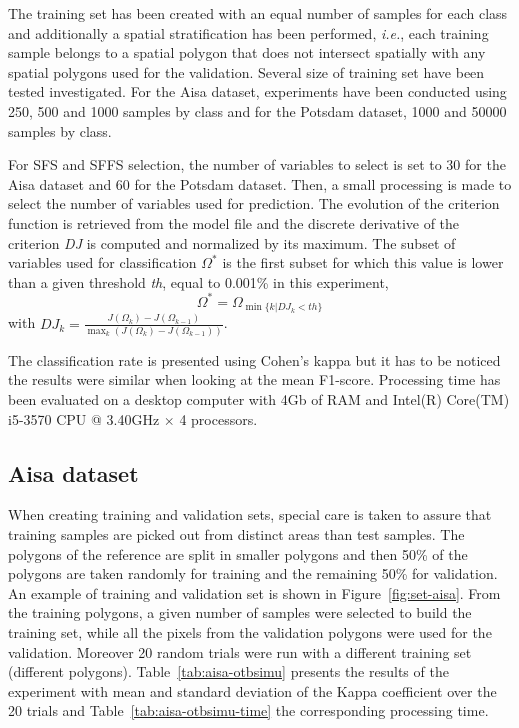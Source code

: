 \documentclass[journal,peerreview,onecolumn]{IEEEtran}
\begin{document}
    The training set has been created  with an equal number of samples
    for each class and additionally  a spatial stratification has been
    performed, \emph{i.e.}, each training  sample belongs to a spatial
    polygon  that  does  not  intersect  spatially  with  any  spatial
    polygons used  for the validation.   Several size of  training set
    have been tested investigated.   For the Aisa dataset, experiments
    have been conducted  using 250, 500 and 1000 samples  by class and
    for the Potsdam dataset, 1000 and 50000 samples by class.

    For SFS and  SFFS selection, the number of variables to select is set to 30 for the Aisa dataset and 60 for the Potsdam dataset. Then, a small processing is made to select the number of variables used for prediction. The evolution of the criterion function is retrieved from the model file and the discrete derivative of the criterion \emph{DJ} is computed and normalized by its maximum. The subset of variables used for classification $\Omega^{*}$ is the first subset for which this value is lower than a given threshold \emph{th}, equal  to 0.001\% in this experiment,
    \begin{equation*}
        \Omega^{*} = \Omega_{\min \{k|DJ_k<th\}}
    \end{equation*}
    with $DJ_k = \frac{J(\Omega_k) - J(\Omega_{k-1})}{\max_k (J(\Omega_k) - J(\Omega_{k-1}))}$.

    The classification  rate is presented  using Cohen's kappa  but it
    has to  be noticed the  results were  similar when looking  at the
    mean F1-score.  Processing time  has been  evaluated on  a desktop
    computer  with 4Gb  of RAM  and  Intel(R) Core(TM)  i5-3570 CPU  @
    3.40GHz $\times$ 4 processors.

    \subsection{Aisa dataset}
    \label{sec:aisa}

    When creating training and validation  sets, special care is taken
    to assure that training samples are picked out from distinct areas
    than test  samples.  The  polygons of the  reference are  split in
    smaller polygons and then 50\%  of the polygons are taken randomly
    for training and the remaining 50\% for validation.  An example of
    training      and     validation      set     is      shown     in
    Figure~\ref{fig:set-aisa}.  From the  training  polygons, a  given
    number of samples  were selected to build the  training set, while
    all  the pixels  from the  validation polygons  were used  for the
    validation.  Moreover 20  random trials were run  with a different
    training  set (different  polygons).  Table~\ref{tab:aisa-otbsimu}
    presents  the results  of the  experiment with  mean and  standard
    deviation  of  the  Kappa  coefficient  over  the  20  trials  and
    Table~\ref{tab:aisa-otbsimu-time}  the   corresponding  processing
    time.
\end{document}
